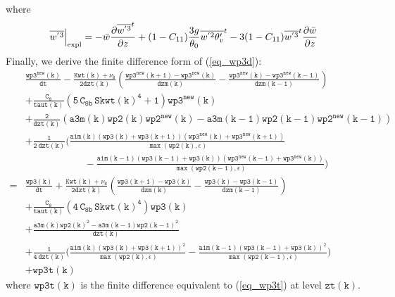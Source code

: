\documentclass[11pt,fleqn]{article}
\newcommand{\ptlder}[2]{\frac{\partial #1}{\partial #2}}
\begin{document}
%
where
%
\begin{equation}
\label{eq_wp3t}
\left. \overline{w^{'3}} \right|_{\rm expl}
= 
  - \bar{w}\ptlder{\overline{w^{'3}}^{t}}{z}	 
  + (1 - C_{11}) \frac{3g}{\theta_0} \overline{w^{'2}\theta'_v}^t
  - 3 ( 1 - C_{11} ) \overline{w^{'3}}^t\ptlder{\bar{w}}{z}
\end{equation}
%
Finally, we derive the finite difference form of (\ref{eq_wp3d}):
%
\begin{equation}
\label{eq_wp3e}
\begin{split}
& \mathtt{
  \frac{wp3^{new}(k)}{dt}
  - \frac{Kwt(k) + \nu_8}{2dzt(k)} 
    \left( 
        \frac{wp3^{new}(k+1)-wp3^{new}(k)}{dzm(k)}
      - \frac{wp3^{new}(k)-wp3^{new}(k-1)}{dzm(k-1)}
    \right)
  } \\
& \mathtt{
+ \frac{C_8}{taut(k)}
   \left(  5 \, C_{8b} \, {Skwt(k)}^4 + 1 \right) wp3^{new}(k)
  } \\
& \mathtt{
  + \frac{2}{dzt(k)} 
    \left(a3m(k) wp2(k) wp2^{new}(k) - a3m(k-1) wp2(k-1) wp2^{new}(k-1) \right)
  } \\
& \mathtt{
  + \frac{1}{2 \, dzt(k)}
    \bigg(
      \frac{ a1m(k)
             \left(wp3(k)+wp3(k+1)\right)
             \left(wp3^{new}(k)+wp3^{new}(k+1)\right) }
           { \max\left( wp2(k), \epsilon \right) }
  } \\
& \mathtt{ \quad \quad \quad \quad \quad \quad
     -\frac{ a1m(k-1) 
             \left(wp3(k-1)+wp3(k)\right)
             \left(wp3^{new}(k-1)+wp3^{new}(k)\right) }
           { \max\left( wp2(k-1), \epsilon \right) }
    \bigg)
  } \\
=& \mathtt{
  \frac{wp3(k)}{dt} 
  + \frac{Kwt(k) + \nu_8}{2dzt(k)} 
    \left( 
        \frac{wp3(k+1)-wp3(k)}{dzm(k)}
      - \frac{wp3(k)-wp3(k-1)}{dzm(k-1)}
    \right)
  } \\
& \mathtt{
+ \frac{C_8}{taut(k)}
   \left( 4 \, C_{8b} \, {Skwt(k)}^4 \right) wp3(k)
  } \\
& \mathtt{
  + \frac{a3m(k) wp2(k)^2 - a3m(k-1) wp2(k-1)^2 }
         {dzt(k)}
  } \\
& \mathtt{
  + \frac{1}{4 \, dzt(k)}
    \bigg(
      \frac{ a1m(k) 
             \left(wp3(k)+wp3(k+1)\right)^2 }
           { \max\left( wp2(k), \epsilon \right) }
     -\frac{ a1m(k-1)
             \left(wp3(k-1)+wp3(k)\right)^2 }
           { \max\left( wp2(k-1), \epsilon \right) }
    \bigg)
  } \\
& \mathtt{
+ wp3t(k)
  }
\end{split}
\end{equation}
%
where $\mathtt{wp3t(k)}$ is the finite difference equivalent to (\ref{eq_wp3t}) 
at level $\mathtt{zt(k)}$.
\end{document}
